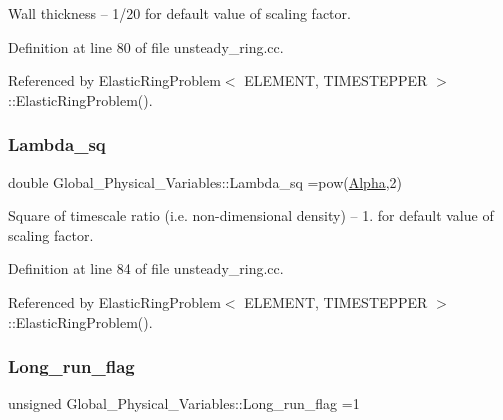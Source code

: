 Wall thickness -- 1/20 for default value of scaling factor. 



Definition at line 80 of file unsteady\+\_\+ring.\+cc.



Referenced by Elastic\+Ring\+Problem$<$ E\+L\+E\+M\+E\+N\+T, T\+I\+M\+E\+S\+T\+E\+P\+P\+E\+R $>$\+::\+Elastic\+Ring\+Problem().

\mbox{\label{namespaceGlobal__Physical__Variables_a6fe17557ceb32dd353827fba60408363}} 
\subsubsection{\texorpdfstring{Lambda\+\_\+sq}{Lambda\_sq}}
{\footnotesize\ttfamily double Global\+\_\+\+Physical\+\_\+\+Variables\+::\+Lambda\+\_\+sq =pow(\hyperlink{namespaceGlobal__Physical__Variables_aa2e802ee7cc8e1ac900ba94c3ce86eb7}{Alpha},2)}



Square of timescale ratio (i.\+e. non-\/dimensional density) -- 1. for default value of scaling factor. 



Definition at line 84 of file unsteady\+\_\+ring.\+cc.



Referenced by Elastic\+Ring\+Problem$<$ E\+L\+E\+M\+E\+N\+T, T\+I\+M\+E\+S\+T\+E\+P\+P\+E\+R $>$\+::\+Elastic\+Ring\+Problem().

\mbox{\label{namespaceGlobal__Physical__Variables_acb18f0e4952b6a1b0840ca94828ace3b}} 
\subsubsection{\texorpdfstring{Long\+\_\+run\+\_\+flag}{Long\_run\_flag}}
{\footnotesize\ttfamily unsigned Global\+\_\+\+Physical\+\_\+\+Variables\+::\+Long\+\_\+run\+\_\+flag =1}



